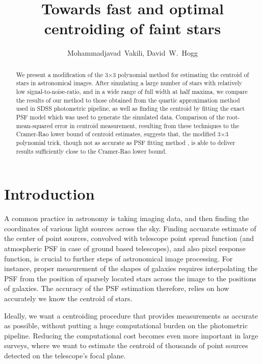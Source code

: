 \documentclass[12pt, preprint]{aastex}
\begin{document}
\author{
  Mohammadjavad~Vakili,
  David~W.~Hogg
}

\title{Towards fast and optimal centroiding of faint stars}

\begin{abstract}

We present a modification of the 3$\times$3 polynomial method for estimating the centroid 
of stars in astronomical images. After simulating a large number of stars with relatively low 
signal-to-noise-ratio, and in a wide range of full width at half maxima, we compare the results
of our method to those obtained from the quartic approximation method used in SDSS photometric pipeline, 
as well as finding the centroid by fitting the exact PSF model which was used to generate the 
simulated data. Comparison of the root-mean-squared error in centroid measurement, resulting 
from these techniques to the Cramer-Rao lower bound of centroid estimates, 
suggests that, the modified 3$\times$3 polynomial trick, though not as accurate as PSF fitting method
, is able to deliver results sufficiently close to the Cramer-Rao lower bound.

\end{abstract}

\section{Introduction}

A common practice in astronomy is taking imaging data, and then finding the coordinates
of various light sources across the sky. Finding accuarate estimate of the center of point
sources, convolved with telescope point spread function (and atmospheric PSF in case of
ground based telescopes), and also pixel response function, is crucial to further steps of
astronomical image processing. For instance, proper measurement of the shapes of galaxies
requires interpolating the PSF from the position of sparsely located stars across the
image to the positions of galaxies. The accuracy of the PSF estimation therefore,
relies on how accurately we know the centroid of stars. 

Ideally, we want a centroiding procedure that provides measurements as accurate as possible,
without putting a huge computational burden on the photometric pipeline.
Reducing the computational cost becomes even more important in large surveys,
where we want to estimate the centroid of thousands of point sources detected
on the telescope's focal plane. 
\end{document}
